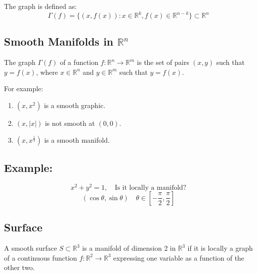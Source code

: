 \documentclass[11pt]{article}
\begin{document}
The graph is defined as:
\[
\Gamma(f) = \{(x,f(x)) : x \in \mathbb{R}^k, f(x) \in \mathbb{R}^{n-k}\} \subset \mathbb{R}^n
\]

\begin{figure}[H]
\end{figure}


\subsection{Smooth Manifolds in $\mathbb{R}^n$}
The graph $\Gamma(f)$ of a function $f : \mathbb{R}^n \rightarrow \mathbb{R}^m$ is the set of pairs $(x,y)$ such that $y = f(x)$, where $x \in \mathbb{R}^n$ and $y \in \mathbb{R}^m$ such that $y = f(x)$.

For example:
\begin{enumerate}[label=(\Alph*)]
    \item $(x,x^2)$ is a smooth graphic.
    \item $(x, |x|)$ is not smooth at $(0,0)$.
    \item $(x,x^{\frac{1}{3}})$ is a smooth manifold.
\end{enumerate}

\subsection*{Example:}
\[
x^2 + y^2 = 1, \quad \text{Is it locally a manifold?}
\]
\[
(\cos \theta, \sin \theta) \quad \theta \in [-\frac{\pi}{2}, \frac{\pi}{2}]
\]

\subsection{Surface} 
A smooth surface $S \subset \mathbb{R}^3$ is a manifold of dimension 2 in $\mathbb{R}^3$ if it is locally a graph of a continuous function $f : \mathbb{R}^2 \rightarrow \mathbb{R}^3$ expressing one variable as a function of the other two.
\end{document}
